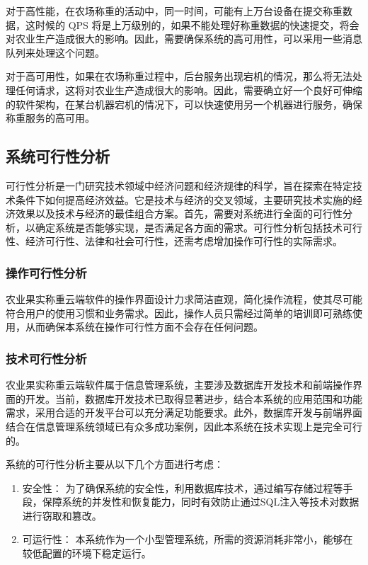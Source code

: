 \documentclass{xduugmr}
\begin{document}
对于高性能，在农场称重的活动中，同一时间，可能有上万台设备在提交称重数据，这时候的 QPS 将是上万级别的，如果不能处理好称重数据的快速提交，将会对农业生产造成很大的影响。因此，需要确保系统的高可用性，可以采用一些消息队列来处理这个问题。

对于高可用性，如果在农场称重过程中，后台服务出现宕机的情况，那么将无法处理任何请求，这将对农业生产造成很大的影响。因此，需要确立好一个良好可伸缩的软件架构，在某台机器宕机的情况下，可以快速使用另一个机器进行服务，确保称重服务的高可用。

\subsection{系统可行性分析}

可行性分析是一门研究技术领域中经济问题和经济规律的科学，旨在探索在特定技术条件下如何提高经济效益。它是技术与经济的交叉领域，主要研究技术实施的经济效果以及技术与经济的最佳组合方案。首先，需要对系统进行全面的可行性分析，以确定系统是否能够实现，是否满足各方面的需求。可行性分析包括技术可行性、经济可行性、法律和社会可行性，还需考虑增加操作可行性的实际需求。

\subsubsection{操作可行性分析}

农业果实称重云端软件的操作界面设计力求简洁直观，简化操作流程，使其尽可能符合用户的使用习惯和业务需求。因此，操作人员只需经过简单的培训即可熟练使用，从而确保本系统在操作可行性方面不会存在任何问题。

\subsubsection{技术可行性分析}

农业果实称重云端软件属于信息管理系统，主要涉及数据库开发技术和前端操作界面的开发。当前，数据库开发技术已取得显著进步，结合本系统的应用范围和功能需求，采用合适的开发平台可以充分满足功能要求。此外，数据库开发与前端界面结合在信息管理系统领域已有众多成功案例，因此本系统在技术实现上是完全可行的。

系统的可行性分析主要从以下几个方面进行考虑：
	
\begin{enumerate}
    \item 安全性：
    为了确保系统的安全性，利用数据库技术，通过编写存储过程等手段，保障系统的并发性和恢复能力，同时有效防止通过SQL注入等技术对数据进行窃取和篡改。
    \item 可运行性：
    本系统作为一个小型管理系统，所需的资源消耗非常小，能够在较低配置的环境下稳定运行。
\end{enumerate}
\end{document}
